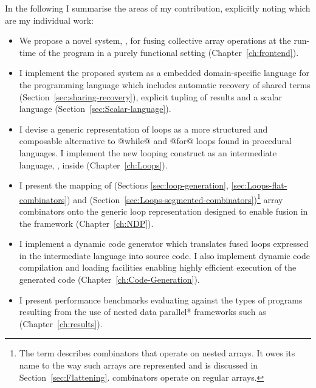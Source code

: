 \documentclass[preamble.tex]{subfiles}
\begin{document}
In the following I summarise the areas of my contribution, explicitly noting which are my individual work:
\begin{itemize}

  \item We propose a novel system, \LiveFusion, for fusing collective array operations at the run-time of the program in a purely functional setting (Chapter~\ref{ch:frontend}).

  \item I implement the proposed system as a embedded domain-specific language for the \Haskell programming language which includes automatic recovery of shared terms (Section~\ref{sec:sharing-recovery}), explicit tupling of results and a scalar language (Section~\ref{sec:Scalar-language}).

  \item I devise a generic representation of loops as a more structured and composable alternative to @while@ and @for@ loops found in procedural languages. I implement the new looping construct as an intermediate language, \Loop, inside \LiveFusion (Chapter~\ref{ch:Loops}).

  \item I present the mapping of  (Sections \ref{sec:loop-generation}, \ref{sec:Loops-flat-combinators}) and  (Section~\ref{sec:Loops-segmented-combinators})\footnote{The term  describes combinators that operate on nested arrays. It owes its name to the way such arrays are represented and is discussed in Section~\ref{sec:Flattening}.  combinators operate on regular arrays.} array combinators onto the generic loop representation designed to enable fusion in the  framework (Chapter~\ref{ch:NDP}).

  \item I implement a dynamic code generator which translates fused loops expressed in the intermediate \Loop language into \Haskell source code. I also implement dynamic code compilation and loading facilities enabling highly efficient execution of the generated code (Chapter~\ref{ch:Code-Generation}).

  \item I present performance benchmarks evaluating \LiveFusion against the types of programs resulting from the use of \*nested data parallel* frameworks such as  (Chapter~\ref{ch:results}).

\end{itemize}
\end{document}
